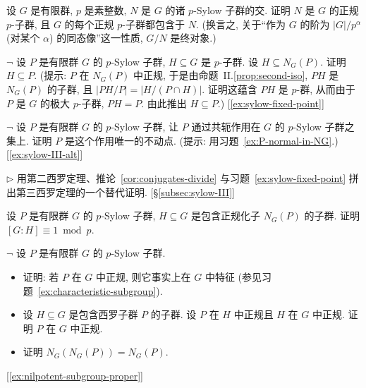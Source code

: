 \begin{prob}
\label{ex:intersection-sylow}
设 $G$ 是有限群, $p$ 是素整数, $N$ 是 $G$ 的诸 $p$-Sylow 子群的交. 证明 $N$ 是 $G$ 的正规 $p$-子群, 且 $G$ 的每个正规 $p$-子群都包含于 $N$. (换言之, 关于``作为 $G$ 的阶为 $|G|/p^{\alpha}$ (对某个 $\alpha$) 的同态像''这一性质, $G/N$ 是终对象.)
\end{prob}

\begin{prob}
\label{ex:P-normal-in-NG}
$\neg$ 设 $P$ 是有限群 $G$ 的 $p$-Sylow 子群, $H \subseteq G$ 是 $p$-子群. 设 $H \subseteq N_G(P)$. 证明 $H \subseteq P$. (提示: $P$ 在 $N_G(P)$ 中正规, 于是由命题~II.\ref{prop:second-iso}, $PH$ 是 $N_G(P)$ 的子群, 且 $|PH/P| = |H/(P \cap H)|$. 证明这蕴含 $PH$ 是 $p$-群, 从而由于 $P$ 是 $G$ 的极大 $p$-子群, $PH = P$. 由此推出 $H \subseteq P$.) [\ref{ex:sylow-fixed-point}]
\end{prob}

\begin{prob}
\label{ex:sylow-fixed-point}
$\neg$ 设 $P$ 是有限群 $G$ 的 $p$-Sylow 子群, 让 $P$ 通过共轭作用在 $G$ 的 $p$-Sylow 子群之集上. 证明 $P$ 是这个作用唯一的不动点. (提示: 用习题~\ref{ex:P-normal-in-NG}.) [\ref{ex:sylow-III-alt}]
\end{prob}

\begin{prob}
\label{ex:sylow-III-alt}
$\triangleright$ 用第二西罗定理、推论~\ref{cor:conjugates-divide} 与习题~\ref{ex:sylow-fixed-point} 拼出第三西罗定理的一个替代证明. [\S\ref{subsec:sylow-III}]
\end{prob}

\begin{prob}
\label{ex:NG-containing}
设 $P$ 是有限群 $G$ 的 $p$-Sylow 子群, $H \subseteq G$ 是包含正规化子 $N_G(P)$ 的子群. 证明 $[G:H] \equiv 1 \bmod p$.
\end{prob}

\begin{prob}
\label{ex:sylow-characteristic}
$\neg$ 设 $P$ 是有限群 $G$ 的 $p$-Sylow 子群.
\begin{itemize}
	\item 证明: 若 $P$ 在 $G$ 中正规, 则它事实上在 $G$ 中特征 (参见习题~\ref{ex:characteristic-subgroup}).
	\item 设 $H \subseteq G$ 是包含西罗子群 $P$ 的子群. 设 $P$ 在 $H$ 中正规且 $H$ 在 $G$ 中正规. 证明 $P$ 在 $G$ 中正规.
	\item 证明 $N_G(N_G(P)) = N_G(P)$.
\end{itemize}
[\ref{ex:nilpotent-subgroup-proper}]
\end{prob}

